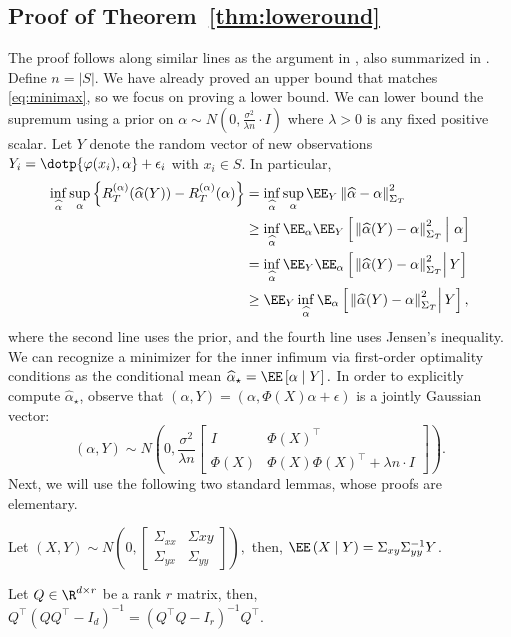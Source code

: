 \subsection{Proof of Theorem~\ref{thm:loweround}}
    The proof follows along similar lines as the argument in \cite{mourtada2022exact}, also summarized in \cite[Section 3.7]{bach2024learning}.
    Define $n = |S|$. We have already proved an upper bound that matches \eqref{eq:minimax}, so we focus on proving a lower bound. %
    We can lower bound the supremum using a prior on $\alpha \sim N\left(0, \tfrac{\sigma^2}{\lambda n} \cdot I\right)$ where $\lambda >0$ is any fixed positive scalar. Let $Y$ denote the random vector of new observations $Y_i = \dotp{\varphi(x_i), \alpha} + \epsilon_i$ with $x_i\in S$. In particular,
\begin{align}
\begin{split}
    \label{eq:lower-bayes}
        \inf_{\widehat \alpha} \mathop{\sup}_{\alpha}\left\{{R}_T^{(\alpha)}(\widehat \alpha(Y)) - {R}_T^{(\alpha)}( \alpha) \right\} & = \inf_{\widehat \alpha} \mathop{\sup}_{\alpha} \EE_Y \left\| \widehat \alpha - \alpha \right\|_{\Sigma_{T}}^2\\
    & \geq \inf_{\widehat \alpha} \EE_{\alpha} \EE_Y \left[ \left.  \left\| \widehat \alpha(Y) - \alpha \right\|_{\Sigma_{T}}^2 \, \right| \, \alpha \right]\\
   & = \inf_{\widehat \alpha} \EE_{Y} \EE_\alpha \left[\left.  \left\| \widehat \alpha(Y) - \alpha \right\|_{\Sigma_{T}}^2 \right| Y\right] \\
   & \geq \EE_{Y} \inf_{\widehat \alpha} \E_{\alpha} \left[\left.  \left\| \widehat \alpha(Y) - \alpha \right\|_{\Sigma_{T}}^2\right| Y\right],
\end{split}
\end{align}
where the second line uses the prior, and the fourth line uses Jensen's inequality. We can recognize a minimizer for the inner infimum via first-order optimality conditions as the conditional mean
$
\widehat \alpha_{\star} = \EE \left[\alpha \mid Y \right].
$
In order to explicitly compute $\widehat \alpha_{\star}$, observe that
$(\alpha,Y)=(\alpha, \Phi(X)\alpha + \epsilon)$ is a jointly Gaussian vector:
$$ (\alpha, Y)\sim N\left(0, \frac{\sigma^2}{\lambda n}\begin{bmatrix}  I &  \Phi(X)^\top \\
\Phi(X) &  \Phi(X)\Phi(X)^\top +  \lambda n \cdot I\end{bmatrix}\right).$$
Next, we will use the following two standard lemmas, whose proofs are elementary.
\begin{lemma}\label{lem:cond-mean}
    Let $(X,Y) \sim N\left(0, \begin{bmatrix} \Sigma_{xx} & \Sigma{xy} \\ \Sigma_{yx} & \Sigma_{yy}\end{bmatrix}\right),$ then, $\EE\left(X \mid Y\right) = \Sigma_{xy}\Sigma_{yy}^{-1}Y$.
\end{lemma}
\begin{lemma}\label{lem:funny-commutativity}
    Let $Q \in \R^{d \times r}$ be a rank $r$ matrix, then, $Q^\top \left(QQ^\top - I_d\right)^{-1} = \left(Q^\top Q - I_r\right)^{-1} Q^\top.$
\end{lemma}

